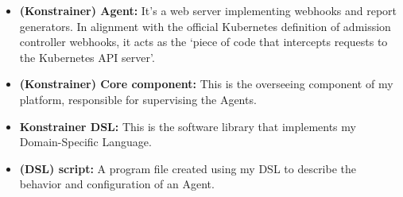 \begin{itemize}
  \item \textbf{(Konstrainer) Agent:} It's a web server implementing webhooks and report generators. In alignment with the official Kubernetes definition of admission controller webhooks, it acts as the `piece of code that intercepts requests to the Kubernetes API server'.
  \item \textbf{(Konstrainer) Core component:} This is the overseeing component of my platform, responsible for supervising the Agents.
  \item \textbf{Konstrainer DSL:} This is the software library that implements my Domain-Specific Language.
  \item \textbf{(DSL) script:} A program file created using my DSL to describe the behavior and configuration of an Agent.
\end{itemize}
